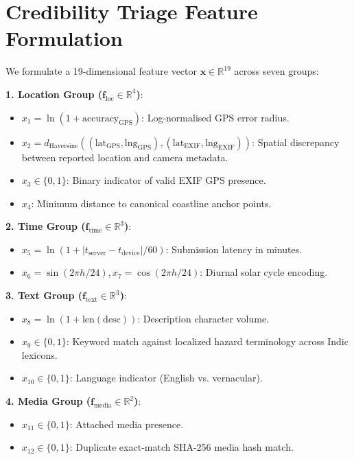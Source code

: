 \documentclass[conference]{IEEEtran}
\begin{document}
\section{Credibility Triage Feature Formulation}
We formulate a 19-dimensional feature vector $\mathbf{x} \in \mathbb{R}^{19}$ across seven groups:

\textbf{1. Location Group ($\mathbf{f}_{\text{loc}} \in \mathbb{R}^4$)}:
\begin{itemize}
    \item $x_1 = \ln(1 + \text{accuracy}_{\text{GPS}})$: Log-normalised GPS error radius.
    \item $x_2 = d_{\text{Haversine}}((\text{lat}_{\text{GPS}}, \text{lng}_{\text{GPS}}), (\text{lat}_{\text{EXIF}}, \text{lng}_{\text{EXIF}}))$: Spatial discrepancy between reported location and camera metadata.
    \item $x_3 \in \{0, 1\}$: Binary indicator of valid EXIF GPS presence.
    \item $x_4$: Minimum distance to canonical coastline anchor points.
\end{itemize}

\textbf{2. Time Group ($\mathbf{f}_{\text{time}} \in \mathbb{R}^3$)}:
\begin{itemize}
    \item $x_5 = \ln(1 + |t_{\text{server}} - t_{\text{device}}| / 60)$: Submission latency in minutes.
    \item $x_6 = \sin(2\pi h / 24), x_7 = \cos(2\pi h / 24)$: Diurnal solar cycle encoding.
\end{itemize}

\textbf{3. Text Group ($\mathbf{f}_{\text{text}} \in \mathbb{R}^3$)}:
\begin{itemize}
    \item $x_8 = \ln(1 + \text{len}(\text{desc}))$: Description character volume.
    \item $x_9 \in \{0, 1\}$: Keyword match against localized hazard terminology across Indic lexicons.
    \item $x_{10} \in \{0, 1\}$: Language indicator (English vs. vernacular).
\end{itemize}

\textbf{4. Media Group ($\mathbf{f}_{\text{media}} \in \mathbb{R}^2$)}:
\begin{itemize}
    \item $x_{11} \in \{0, 1\}$: Attached media presence.
    \item $x_{12} \in \{0, 1\}$: Duplicate exact-match SHA-256 media hash match.
\end{itemize}
\end{document}
